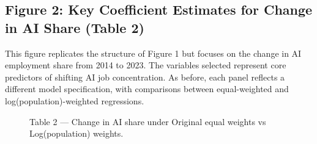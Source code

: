 \documentclass[
]{article}
\begin{document}
\subsection{Figure 2: Key Coefficient Estimates for Change in AI Share
(Table
2)}\label{figure-2-key-coefficient-estimates-for-change-in-ai-share-table-2}

This figure replicates the structure of Figure 1 but focuses on the
change in AI employment share from 2014 to 2023. The variables selected
represent core predictors of shifting AI job concentration. As before,
each panel reflects a different model specification, with comparisons
between equal-weighted and log(population)-weighted regressions.

\begin{figure}[H]

\caption{\label{fig-table2-coefs}Table 2 --- Change in AI share under
Original equal weights vs Log(population) weights.}

\centering{

}
\end{figure}
\end{document}
